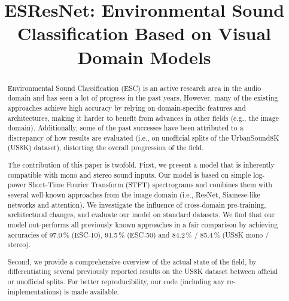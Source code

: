 \documentclass[a4paper,conference]{IEEEtran}
\begin{document}
\title{ESResNet: Environmental Sound Classification Based on Visual Domain Models}



\author{
}












\maketitle

\begin{abstract}

Environmental Sound Classification (ESC) is an active research area in the audio domain and has seen a lot of progress in the past years.
However, many of the existing approaches achieve high accuracy by relying on domain-specific features and architectures, making it harder to benefit from advances in other fields (e.g., the image domain).
Additionally, some of the past successes have been attributed to a discrepancy of how results are evaluated (i.e., on unofficial splits of the UrbanSound8K (US8K) dataset), distorting the overall progression of the field.

The contribution of this paper is twofold.
First, we present a model that is inherently compatible with mono and stereo sound inputs.
Our model is based on simple log-power Short-Time Fourier Transform (STFT) spectrograms and combines them with several well-known approaches from the image domain (i.e., ResNet, Siamese-like networks and attention).
We investigate the influence of cross-domain pre-training, architectural changes, and evaluate our model on standard datasets.
We find that our model out-performs all previously known approaches in a fair comparison by achieving accuracies of 97.0\,\% (ESC-10), 91.5\,\% (ESC-50) and 84.2\,\% / 85.4\,\% (US8K mono / stereo).

Second, we provide a comprehensive overview of the actual state of the field, by differentiating several previously reported results on the US8K dataset between official or unofficial splits.
For better reproducibility, our code (including any re-implementations) is made available.


\end{abstract}
\end{document}
